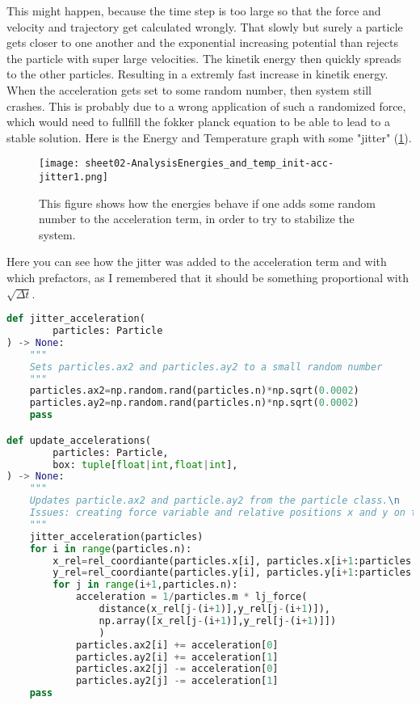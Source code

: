 \documentclass{article}
\begin{document}
This might happen, because the time step is too large so that the force and velocity and trajectory get calculated wrongly. That slowly but surely a particle gets closer to one another and the exponential increasing potential than rejects the particle with super large velocities. The kinetik energy then quickly spreads to the other particles. Resulting in a extremly fast increase in kinetik energy.\\

When the acceleration gets set to some random number, then system still crashes. This is probably due to a wrong application of such a randomized force, which would need to fullfill the fokker planck equation to be able to lead to a stable solution. Here is the Energy and Temperature graph with some "jitter" (\ref{fig:energy-with-jitter}).

\begin{figure}[ht]
    \centering
    \texttt{[image: sheet02-AnalysisEnergies\_and\_temp\_init-acc-jitter1.png]}
    \caption{This figure shows how the energies behave if one adds some random number to the acceleration term, in order to try to stabilize the system.}
    \label{fig:energy-with-jitter}
\end{figure}
Here you can see how the jitter was added to the acceleration term and with which prefactors, as I remembered that it should be something proportional with $\sqrt{\Delta t}$.
\newpage
\begin{lstlisting}[language=Python, caption=Energy Plotting]
def jitter_acceleration(
        particles: Particle
) -> None:
    """
    Sets particles.ax2 and particles.ay2 to a small random number 
    """
    particles.ax2=np.random.rand(particles.n)*np.sqrt(0.0002)
    particles.ay2=np.random.rand(particles.n)*np.sqrt(0.0002)
    pass

def update_accelerations(
        particles: Particle,
        box: tuple[float|int,float|int],    
) -> None:
    """
    Updates particle.ax2 and particle.ay2 from the particle class.\n
    Issues: creating force variable and relative positions x and y on the fly.
    """
    jitter_acceleration(particles)
    for i in range(particles.n):
        x_rel=rel_coordiante(particles.x[i], particles.x[i+1:particles.n],box[0]) 
        y_rel=rel_coordiante(particles.y[i], particles.y[i+1:particles.n],box[1])
        for j in range(i+1,particles.n):
            acceleration = 1/particles.m * lj_force(
                distance(x_rel[j-(i+1)],y_rel[j-(i+1)]),
                np.array([x_rel[j-(i+1)],y_rel[j-(i+1)]])
                ) 
            particles.ax2[i] += acceleration[0]  
            particles.ay2[i] += acceleration[1]
            particles.ax2[j] -= acceleration[0] 
            particles.ay2[j] -= acceleration[1]
    pass
\end{lstlisting}
\end{document}
